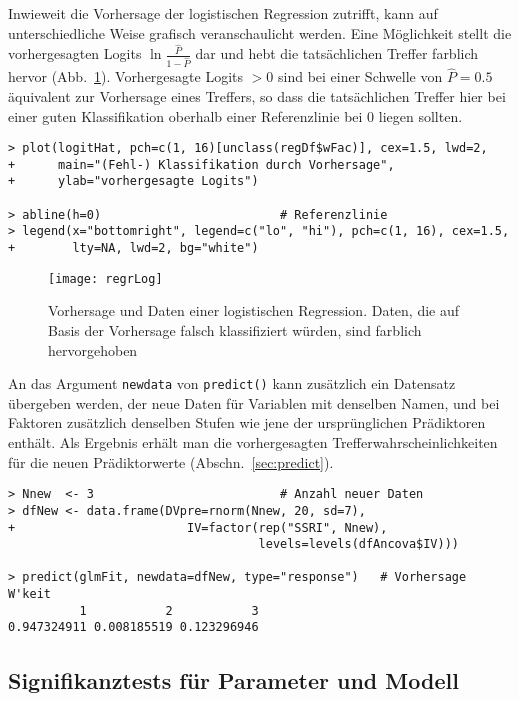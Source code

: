Inwieweit die Vorhersage der logistischen Regression zutrifft, kann auf unterschiedliche Weise grafisch veranschaulicht werden. Eine Möglichkeit stellt die vorhergesagten Logits $\ln \frac{\hat{P}}{1-\hat{P}}$ dar und hebt die tatsächlichen Treffer farblich hervor (Abb.\ \ref{fig:regrLog}). Vorhergesagte Logits $> 0$ sind bei einer Schwelle von $\hat{P}=0.5$ äquivalent zur Vorhersage eines Treffers, so dass die tatsächlichen Treffer hier bei einer guten Klassifikation oberhalb einer Referenzlinie bei $0$ liegen sollten.
\begin{lstlisting}
> plot(logitHat, pch=c(1, 16)[unclass(regDf$wFac)], cex=1.5, lwd=2,
+      main="(Fehl-) Klassifikation durch Vorhersage",
+      ylab="vorhergesagte Logits")

> abline(h=0)                         # Referenzlinie
> legend(x="bottomright", legend=c("lo", "hi"), pch=c(1, 16), cex=1.5,
+        lty=NA, lwd=2, bg="white")
\end{lstlisting}

\begin{figure}[ht]
\centering
\texttt{[image: regrLog]}
\vspace*{-1em}
\caption{Vorhersage und Daten einer logistischen Regression. Daten, die auf Basis der Vorhersage falsch klassifiziert würden, sind farblich hervorgehoben}
\label{fig:regrLog}
\end{figure}

An das Argument \lstinline!newdata! von \lstinline!predict()! kann zusätzlich ein Datensatz übergeben werden, der neue Daten für Variablen mit denselben Namen, und bei Faktoren zusätzlich denselben Stufen wie jene der ursprünglichen Prädiktoren enthält. Als Ergebnis erhält man die vorhergesagten Trefferwahrscheinlichkeiten für die neuen Prädiktorwerte (Abschn.\ \ref{sec:predict}).
\begin{lstlisting}
> Nnew  <- 3                          # Anzahl neuer Daten
> dfNew <- data.frame(DVpre=rnorm(Nnew, 20, sd=7),
+                        IV=factor(rep("SSRI", Nnew),
                                   levels=levels(dfAncova$IV)))

> predict(glmFit, newdata=dfNew, type="response")   # Vorhersage W'keit
          1           2           3
0.947324911 0.008185519 0.123296946
\end{lstlisting}

\subsection{Signifikanztests für Parameter und Modell}
\label{sec:regrLogTest}

